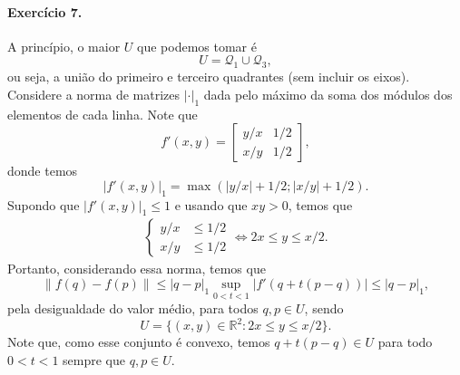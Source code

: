 \documentclass[12pt,a4paper]{article}
\newcommand{\R}{\mathbb{R}}
\begin{document}
\paragraph{Exercício 7.}
    A princípio, o maior $U$ que podemos tomar é
    \begin{equation*}
        U = \mathcal{Q}_1 \cup \mathcal{Q}_3,
    \end{equation*}
    ou seja, a união do primeiro e terceiro quadrantes (sem incluir os eixos). Considere a norma de matrizes $|\cdot|_1$ 
    dada pelo máximo da soma dos
    módulos dos elementos de cada linha. Note que
    \begin{equation*}
        f'(x,y) = 
        \begin{bmatrix}
            y/x & 1/2 \\
            x/y & 1/2
        \end{bmatrix},
    \end{equation*}
    donde temos
    \begin{equation*}
        |f'(x,y)|_1 = \max(|y/x| + 1/2; |x/y| + 1/2).
    \end{equation*}
    Supondo que $|f'(x,y)|_1 \leq 1$ e usando que $xy>0$, temos que
    \begin{align*}
        \begin{cases}
            y/x &\leq 1/2 \\
            x/y &\leq 1/2
        \end{cases} \iff
        2x \leq y \leq x/2.
    \end{align*}
    Portanto, considerando essa norma, temos que
    \begin{equation*}
        \| f(q) - f(p) \| \leq |q-p|_1\sup_{0<t<1}|f'(q + t(p-q))|
                          \leq |q-p|_1,
    \end{equation*}
    pela desigualdade do valor médio, para todos $q,p \in U$, sendo
    \begin{equation*}
        U = \{ (x,y)\in\R^2 : 2x \leq y \leq x/2 \}.
    \end{equation*}
    Note que, como esse conjunto é convexo, temos $q + t(p-q)\in U$
    para todo $0<t<1$ sempre que $q,p\in U$.
\end{document}
